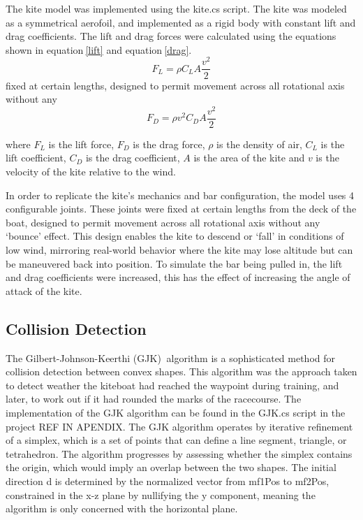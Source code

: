 The kite model was implemented using the kite.cs script. The kite was modeled as a symmetrical aerofoil, and implemented as a rigid body with constant lift and drag coefficients. The lift and drag forces were calculated using the equations shown in equation$~$\ref{lift} and equation$~$\ref{drag}.
\begin{equation}
    F_L = \rho C_L A \frac{v^2}{2} 
    \label{lift}
\end{equation}fixed at certain lengths, designed to permit movement across all rotational axis without any
\begin{equation}
    F_D = \rho v^2 C_D A \frac{v^2}{2} 
    \label{drag}
\end{equation}

where $F_L$ is the lift force, $F_D$ is the drag force, $\rho$ is the density of air, $C_L$ is the lift coefficient, $C_D$ is the drag coefficient, $A$ is the area of the kite and $v$ is the velocity of the kite relative to the wind.

In order to replicate the kite's mechanics and bar configuration, the model uses 4 configurable joints. These joints were fixed at certain lengths from the deck of the boat, designed to permit movement across all rotational axis without any `bounce' effect. This design enables the kite to descend or `fall' in conditions of low wind, mirroring real-world behavior where the kite may lose altitude but can be maneuvered back into position. To simulate the bar being pulled in, the lift and drag coefficients were increased, this has the effect of increasing the angle of attack of the kite.


\subsection{Collision Detection}
The Gilbert-Johnson-Keerthi (GJK)$~$\cite{gilbert88gjk} algorithm is a sophisticated method for collision detection between convex shapes. This algorithm was the approach taken to detect weather the kiteboat had reached the waypoint during training, and later, to work out if it had rounded the marks of the racecourse. The implementation of the GJK algorithm can be found in the GJK.cs script in the project REF IN APENDIX.
The GJK algorithm operates by iterative refinement of a simplex, which is a set of points that can define a line segment, triangle, or tetrahedron. The algorithm progresses by assessing whether the simplex contains the origin, which would imply an overlap between the two shapes. The initial direction d is determined by the normalized vector from mf1Pos to mf2Pos, constrained in the x-z plane by nullifying the y component, meaning the algorithm is only concerned with the horizontal plane.  

